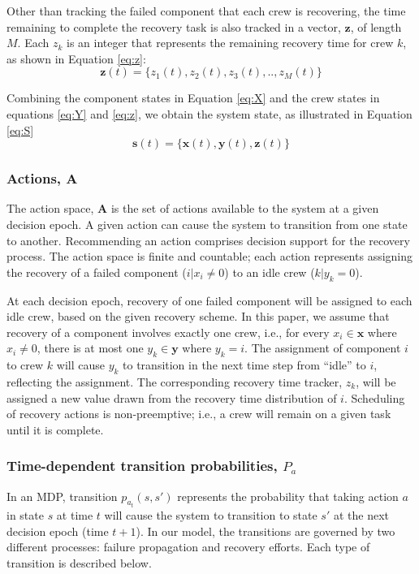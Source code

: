 \documentclass[conference]{IEEEtran}
\begin{document}
Other than tracking the failed component that each crew is recovering, the time remaining to complete the recovery task is also tracked in a vector, $\mathbf{z}$, of length $M$. Each $z_k$ is an integer that represents the remaining recovery time for crew $k$, as shown in Equation \ref{eq:z}:
\begin{equation}
    \mathbf{z}(t) = \{z_1(t), z_2(t), z_3(t), .., z_M(t)\}
    \label{eq:z}
\end{equation}


Combining the component states in Equation \ref{eq:X} and the crew states in equations \ref{eq:Y} and \ref{eq:z}, we obtain the system state, as illustrated in Equation \ref{eq:S}
\begin{equation}
    \mathbf{s}(t) = \{\mathbf{x}(t),\mathbf{y}(t), \mathbf{z}(t) \}
    \label{eq:S}
\end{equation}

\subsubsection{Actions, \texorpdfstring{$\mathbf{A}$}{A}}
The action space, $\mathbf{A}$ is the set of actions available to the system at a given decision epoch. A given action can cause the system to transition from one state to another. Recommending an action comprises decision support for the recovery process. The action space is finite and countable; each action represents assigning the recovery of a failed component ($i | x_i \neq 0$)  to an idle crew ($k | y_k = 0$). 

At each decision epoch, recovery of one failed component will be assigned to each idle crew, based on the given recovery scheme. In this paper, we assume that recovery of a component involves exactly one crew, i.e., for every $x_i \in \mathbf{x}$ where $x_i \neq 0$, there is at most one $y_k \in \mathbf{y}$ where $y_k = i$. The assignment of component $i$ to crew $k$ will cause $y_k$ to transition in the next time step from ``idle'' to $i$, reflecting the assignment. The corresponding recovery time tracker, $z_k$, will be assigned a new value drawn from the recovery time distribution of $i$. Scheduling of recovery actions is non-preemptive; i.e., a crew will remain on a given task until it is complete. 

\subsubsection{Time-dependent transition probabilities, \texorpdfstring{$P_a$}{P}}
In an MDP, transition $p_{a_t}(s,s')$ represents the probability that taking action $a$ in state $s$ at time $t$ will cause the system to transition to state $s'$ at the next decision epoch (time $t+1$). In our model, the transitions are governed by two different processes: failure propagation and recovery efforts. Each type of transition is described below.
\end{document}
